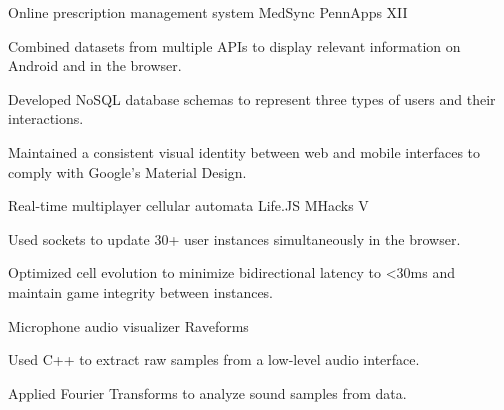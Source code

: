 \begin{cventries}
  \cventry
    {Online prescription management system}
    {MedSync}
    {PennApps XII}
    {}
    {
      \begin{cvitems}
        \item {Combined datasets from multiple APIs to display relevant information on Android and in the browser.}
        \item {Developed NoSQL database schemas to represent three types of users and their interactions.}
        \item {Maintained a consistent visual identity between web and mobile interfaces to comply with Google's Material Design.}
      \end{cvitems}
    }
  \cventry
    {Real-time multiplayer cellular automata}
    {Life.JS}
    {MHacks V}
    {}
    {
      \begin{cvitems}
        \item {Used sockets to update 30+ user instances simultaneously in the browser.}
        \item {Optimized cell evolution to minimize bidirectional latency to <30ms and maintain game integrity between instances.}
      \end{cvitems}
    }
  \cventry
    {Microphone audio visualizer}
    {Raveforms}
    {}
    {}
    {
      \begin{cvitems}
        \item {Used C++ to extract raw samples from a low-level audio interface.}
        \item {Applied Fourier Transforms to analyze sound samples from data.}
      \end{cvitems}
    }
\end{cventries}
